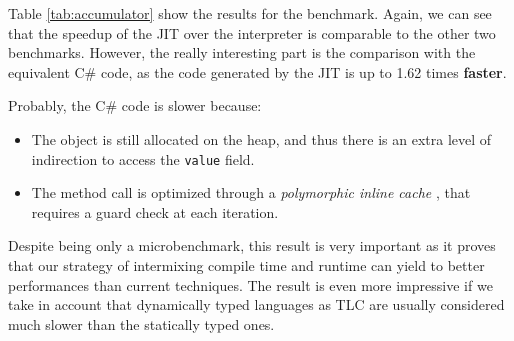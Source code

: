 Table \ref{tab:accumulator} show the results for the benchmark.  Again, we can
see that the speedup of the JIT over the interpreter is comparable to the
other two benchmarks.  However, the really interesting part is the comparison
with the equivalent C\# code, as the code generated by the JIT is up to 1.62 times
\textbf{faster}.

Probably, the C\# code is slower because:

\begin{itemize}
\item The object is still allocated on the heap, and thus there is an extra
  level of indirection to access the \lstinline{value} field.
\item The method call is optimized through a \emph{polymorphic inline cache}
  \cite{hoelzle_optimizing_1991}, that requires a guard check at each iteration.
\end{itemize}

Despite being only a microbenchmark, this result is very important as it proves
that our strategy of intermixing compile time and runtime can yield to better
performances than current techniques.  The result is even more impressive if
we take in account that dynamically typed languages as TLC are usually considered much
slower than the statically typed ones.
